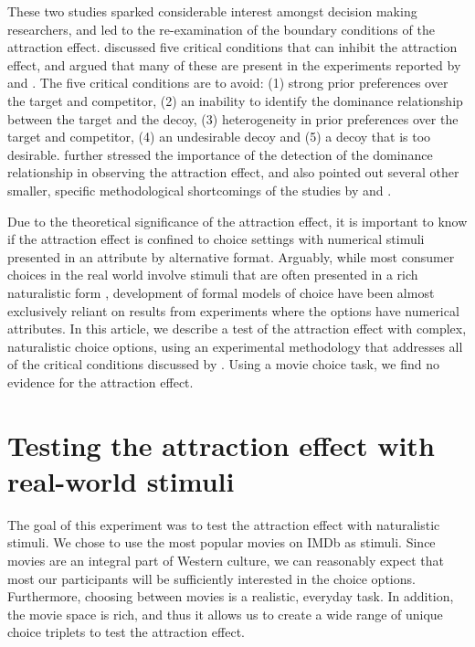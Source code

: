 \documentclass[12pt, a4paper]{article}
\begin{document}
These two studies sparked considerable interest amongst decision making researchers, and led to the re-examination of the boundary conditions of the attraction effect.  discussed five critical conditions that can inhibit the attraction effect, and argued that many of these are present in the experiments reported by \citeauthor{Frederick2014} and \citeauthor{Yang2014}. The five critical conditions are to avoid: (1) strong prior preferences over the target and competitor, (2) an inability to identify the dominance relationship  between the target and the decoy, (3) heterogeneity in prior preferences over the target and competitor, (4) an undesirable decoy and (5) a decoy that is too desirable.  further stressed the importance of the detection of the dominance relationship in observing the attraction effect, and also pointed out several other smaller, specific methodological shortcomings of the studies by \citeauthor{Frederick2014} and \citeauthor{Yang2014}.

Due to the theoretical significance of the attraction effect, it is important to know if the attraction effect is confined to choice settings with numerical stimuli presented in an attribute by alternative format. Arguably, while most consumer choices in the real world involve stimuli that are often presented in a rich naturalistic form \cite{Bhatia2018b}, development of formal models of choice have been almost exclusively reliant on results from experiments where the options have numerical attributes. In this article, we describe a test of the attraction effect with complex, naturalistic choice options, using an experimental methodology that addresses all of the critical conditions discussed by . Using a movie choice task, we find no evidence for the attraction effect.

\section*{Testing the attraction effect with real-world stimuli}

The goal of this experiment was to test the attraction effect with naturalistic stimuli. We chose to use the most popular movies on IMDb as stimuli. Since movies are an integral part of Western culture, we can reasonably expect that most our participants will be sufficiently interested in the choice options. Furthermore, choosing between movies is a realistic, everyday task. In addition, the movie space is rich, and thus it allows us to create a wide range of unique choice triplets to test the attraction effect.
\end{document}

